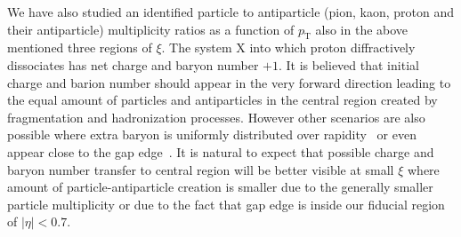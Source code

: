 We have also studied an identified particle to antiparticle (pion, kaon, proton and their antiparticle) multiplicity ratios as a function of $p_\textrm{T}$ also in the above mentioned three regions of $\xi$. The system $\textrm{X}$ into which proton diffractively dissociates has net charge and baryon number $+1$. It is believed that initial charge and barion number should appear in the very forward direction leading to the equal amount of particles and antiparticles in the central region created by fragmentation and hadronization processes. However other scenarios are also possible where extra baryon is uniformly distributed over rapidity~\cite{Kopeliovich:1988qm} or even appear close to the gap edge~\cite{Bopp:2000vg}. It is natural to expect that possible charge and baryon number transfer to central region will be better visible at small $\xi$ where amount of particle-antiparticle creation is smaller due to the generally smaller particle multiplicity or due to the fact that gap edge is inside our fiducial region of $|\eta|<0.7$.
